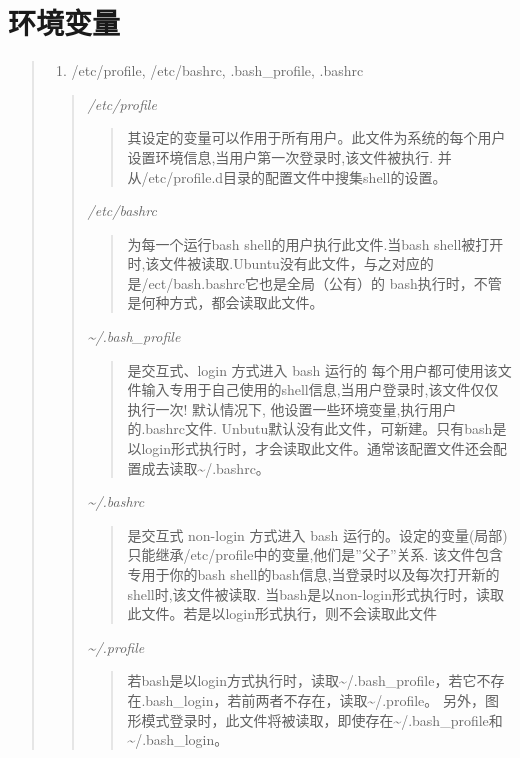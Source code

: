 \documentclass[letterpaper,10pt,english]{sphinxmanual}
\begin{document}
\chapter{环境变量}
\label{index:id3}\begin{quote}
\begin{enumerate}
\item {} 
/etc/profile, /etc/bashrc, .bash\_profile, .bashrc

\end{enumerate}
\begin{quote}

\emph{/etc/profile}
\begin{quote}

其设定的变量可以作用于所有用户。此文件为系统的每个用户设置环境信息,当用户第一次登录时,该文件被执行. 并从/etc/profile.d目录的配置文件中搜集shell的设置。
\end{quote}

\emph{/etc/bashrc}
\begin{quote}

为每一个运行bash shell的用户执行此文件.当bash shell被打开时,该文件被读取.Ubuntu没有此文件，与之对应的是/ect/bash.bashrc它也是全局（公有）的 bash执行时，不管是何种方式，都会读取此文件。
\end{quote}

\emph{\textasciitilde{}/.bash\_profile}
\begin{quote}

是交互式、login 方式进入 bash 运行的 每个用户都可使用该文件输入专用于自己使用的shell信息,当用户登录时,该文件仅仅执行一次! 默认情况下, 他设置一些环境变量,执行用户的.bashrc文件. Unbutu默认没有此文件，可新建。只有bash是以login形式执行时，才会读取此文件。通常该配置文件还会配置成去读取\textasciitilde{}/.bashrc。
\end{quote}

\emph{\textasciitilde{}/.bashrc}
\begin{quote}

是交互式 non-login 方式进入 bash 运行的。设定的变量(局部)只能继承/etc/profile中的变量,他们是''父子''关系. 该文件包含专用于你的bash shell的bash信息,当登录时以及每次打开新的shell时,该文件被读取. 当bash是以non-login形式执行时，读取此文件。若是以login形式执行，则不会读取此文件
\end{quote}

\emph{\textasciitilde{}/.profile}
\begin{quote}

若bash是以login方式执行时，读取\textasciitilde{}/.bash\_profile，若它不存在.bash\_login，若前两者不存在，读取\textasciitilde{}/.profile。 另外，图形模式登录时，此文件将被读取，即使存在\textasciitilde{}/.bash\_profile和\textasciitilde{}/.bash\_login。
\end{quote}


\end{quote}
\end{quote}
\end{document}

